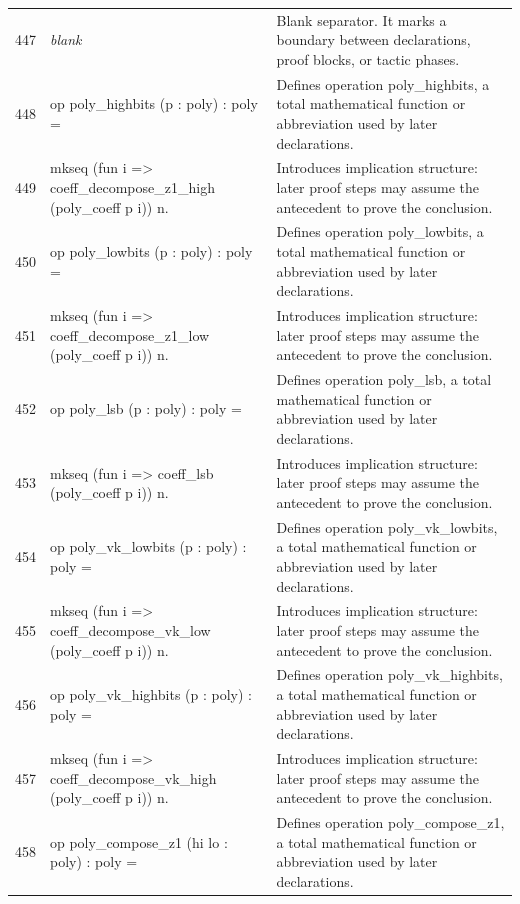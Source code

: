 \documentclass[10pt]{article}
\begin{document}
\begin{longtable}{r L{0.53\textwidth} L{0.37\textwidth}}
447 & {\ttfamily\scriptsize \emph{blank}} & Blank separator.  It marks a boundary between declarations, proof blocks, or tactic phases. \\
448 & {\ttfamily\scriptsize op poly\_highbits (p : poly) : poly =} & Defines operation poly\_highbits, a total mathematical function or abbreviation used by later declarations. \\
449 & {\ttfamily\scriptsize   mkseq (fun i => coeff\_decompose\_z1\_high (poly\_coeff p i)) n.} & Introduces implication structure: later proof steps may assume the antecedent to prove the conclusion. \\
450 & {\ttfamily\scriptsize op poly\_lowbits (p : poly) : poly =} & Defines operation poly\_lowbits, a total mathematical function or abbreviation used by later declarations. \\
451 & {\ttfamily\scriptsize   mkseq (fun i => coeff\_decompose\_z1\_low (poly\_coeff p i)) n.} & Introduces implication structure: later proof steps may assume the antecedent to prove the conclusion. \\
452 & {\ttfamily\scriptsize op poly\_lsb (p : poly) : poly =} & Defines operation poly\_lsb, a total mathematical function or abbreviation used by later declarations. \\
453 & {\ttfamily\scriptsize   mkseq (fun i => coeff\_lsb (poly\_coeff p i)) n.} & Introduces implication structure: later proof steps may assume the antecedent to prove the conclusion. \\
454 & {\ttfamily\scriptsize op poly\_vk\_lowbits (p : poly) : poly =} & Defines operation poly\_vk\_lowbits, a total mathematical function or abbreviation used by later declarations. \\
455 & {\ttfamily\scriptsize   mkseq (fun i => coeff\_decompose\_vk\_low (poly\_coeff p i)) n.} & Introduces implication structure: later proof steps may assume the antecedent to prove the conclusion. \\
456 & {\ttfamily\scriptsize op poly\_vk\_highbits (p : poly) : poly =} & Defines operation poly\_vk\_highbits, a total mathematical function or abbreviation used by later declarations. \\
457 & {\ttfamily\scriptsize   mkseq (fun i => coeff\_decompose\_vk\_high (poly\_coeff p i)) n.} & Introduces implication structure: later proof steps may assume the antecedent to prove the conclusion. \\
458 & {\ttfamily\scriptsize op poly\_compose\_z1 (hi lo : poly) : poly =} & Defines operation poly\_compose\_z1, a total mathematical function or abbreviation used by later declarations. \\

\end{longtable}
\end{document}
